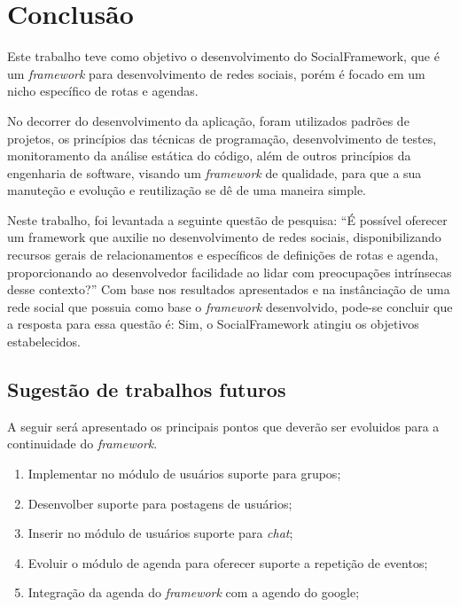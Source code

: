 \chapter{Conclusão}
\label{chapter:Conclusao}
Este trabalho teve como objetivo o desenvolvimento do SocialFramework, que é um \textit{framework} para desenvolvimento de redes sociais, porém é focado em um nicho específico de rotas e agendas.

No decorrer do desenvolvimento da aplicação, foram utilizados padrões de projetos, os princípios das técnicas de programação, desenvolvimento de testes, monitoramento da análise estática do código, além de outros princípios da engenharia de software, visando um \textit{framework} de qualidade, para que a sua manuteção e evolução e reutilização se dê de uma maneira simple.

Neste trabalho, foi levantada a seguinte questão de pesquisa: ``É possível oferecer um framework que auxilie no desenvolvimento de redes sociais, disponibilizando recursos gerais de relacionamentos e específicos de definições de rotas e agenda, proporcionando ao desenvolvedor facilidade ao lidar com preocupações intrínsecas desse contexto?'' Com base nos resultados apresentados e na instânciação de uma rede social que possuia como base o \textit{framework} desenvolvido, pode-se concluir que a resposta para essa questão é: Sim, o SocialFramework atingiu os objetivos estabelecidos.

\section{Sugestão de trabalhos futuros}

A seguir será apresentado os principais pontos que deverão ser evoluidos para a continuidade do \textit{framework}.

\begin{enumerate}
	\item Implementar no módulo de usuários suporte para grupos;
	\item Desenvolber suporte para postagens de usuários;
	\item Inserir no módulo de usuários suporte para \textit{chat};
	\item Evoluir o módulo de agenda para oferecer suporte a repetição de eventos;
	\item Integração da agenda do \textit{framework} com a agendo do google;
\end{enumerate}

